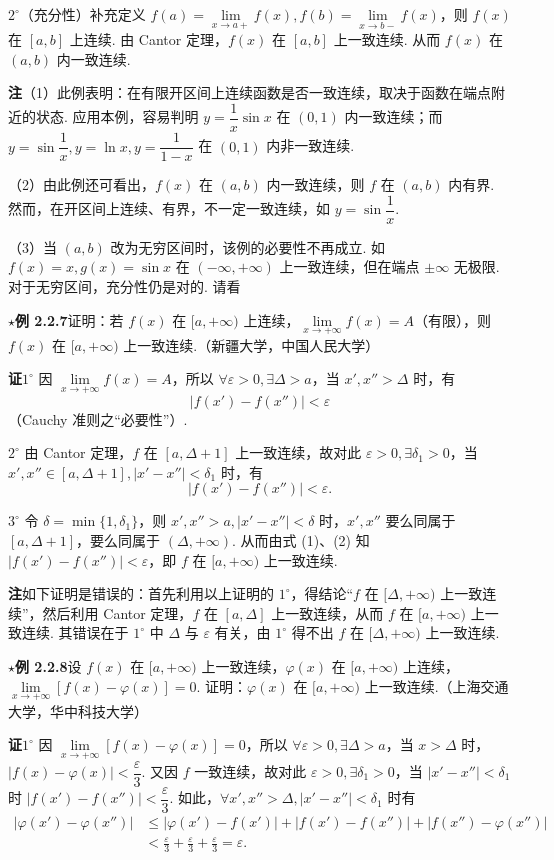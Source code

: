 \documentclass[UTF8,12pt,a4paper,fontset=fandol]{ctexart}
\begin{document}
$2^\circ$（充分性）补充定义 $f(a)=\lim\limits_{x\to a+}f(x),f(b)=\lim\limits_{x\to b-}f(x)$，则 $f(x)$ 在 $[a,b]$ 上连续. 由 Cantor 定理，$f(x)$ 在 $[a,b]$ 上一致连续. 从而 $f(x)$ 在 $(a,b)$ 内一致连续.

\noindent\textbf{注}\quad （1）此例表明：在有限开区间上连续函数是否一致连续，取决于函数在端点附近的状态. 应用本例，容易判明 $y=\dfrac1x\sin x$ 在 $(0,1)$ 内一致连续；而 $y=\sin\dfrac1x,y=\ln x,y=\dfrac1{1-x}$ 在 $(0,1)$ 内非一致连续.

（2）由此例还可看出，$f(x)$ 在 $(a,b)$ 内一致连续，则 $f$ 在 $(a,b)$ 内有界. 然而，在开区间上连续、有界，不一定一致连续，如 $y=\sin\dfrac1x$.

（3）当 $(a,b)$ 改为无穷区间时，该例的必要性不再成立. 如 $f(x)=x,g(x)=\sin x$ 在 $(-\infty,+\infty)$ 上一致连续，但在端点 $\pm\infty$ 无极限. 对于无穷区间，充分性仍是对的. 请看

\noindent\textbf{$\star$例 2.2.7}\quad 证明：若 $f(x)$ 在 $[a,+\infty)$ 上连续，$\lim\limits_{x\to+\infty}f(x)=A$（有限），则 $f(x)$ 在 $[a,+\infty)$ 上一致连续.（新疆大学，中国人民大学）

\noindent\textbf{证}\quad $1^\circ$ 因 $\lim\limits_{x\to+\infty}f(x)=A$，所以 $\forall\varepsilon>0,\exists\Delta>a$，当 $x',x''>\Delta$ 时，有
\[
  |f(x')-f(x'')|<\varepsilon \tag{1}
\]
（Cauchy 准则之“必要性”）.

$2^\circ$ 由 Cantor 定理，$f$ 在 $[a,\Delta+1]$ 上一致连续，故对此 $\varepsilon>0,\exists\delta_1>0$，当 $x',x''\in[a,\Delta+1],|x'-x''|<\delta_1$ 时，有
\[
  |f(x')-f(x'')|<\varepsilon. \tag{2}
\]

$3^\circ$ 令 $\delta=\min\{1,\delta_1\}$，则 $x',x''>a,|x'-x''|<\delta$ 时，$x',x''$ 要么同属于 $[a,\Delta+1]$，要么同属于 $(\Delta,+\infty)$. 从而由式 (1)、(2) 知 $|f(x')-f(x'')|<\varepsilon$，即 $f$ 在 $[a,+\infty)$ 上一致连续.

\noindent\textbf{注}\quad 如下证明是错误的：首先利用以上证明的 $1^\circ$，得结论“$f$ 在 $[\Delta,+\infty)$ 上一致连续”，然后利用 Cantor 定理，$f$ 在 $[a,\Delta]$ 上一致连续，从而 $f$ 在 $[a,+\infty)$ 上一致连续. 其错误在于 $1^\circ$ 中 $\Delta$ 与 $\varepsilon$ 有关，由 $1^\circ$ 得不出 $f$ 在 $[\Delta,+\infty)$ 上一致连续.

\noindent\textbf{$\star$例 2.2.8}\quad 设 $f(x)$ 在 $[a,+\infty)$ 上一致连续，$\varphi(x)$ 在 $[a,+\infty)$ 上连续，$\lim\limits_{x\to+\infty}[f(x)-\varphi(x)]=0$. 证明：$\varphi(x)$ 在 $[a,+\infty)$ 上一致连续.（上海交通大学，华中科技大学）

\noindent\textbf{证}\quad $1^\circ$ 因 $\lim\limits_{x\to+\infty}[f(x)-\varphi(x)]=0$，所以 $\forall\varepsilon>0,\exists\Delta>a$，当 $x>\Delta$ 时，$|f(x)-\varphi(x)|<\dfrac\varepsilon3$. 又因 $f$ 一致连续，故对此 $\varepsilon>0,\exists\delta_1>0$，当 $|x'-x''|<\delta_1$ 时 $|f(x')-f(x'')|<\dfrac\varepsilon3$. 如此，$\forall x',x''>\Delta,|x'-x''|<\delta_1$ 时有
\[
\begin{aligned}
|\varphi(x')-\varphi(x'')|
&\le |\varphi(x')-f(x')|+|f(x')-f(x'')|+|f(x'')-\varphi(x'')|\\
&<\frac\varepsilon3+\frac\varepsilon3+\frac\varepsilon3=\varepsilon.
\end{aligned}
\]
\end{document}
